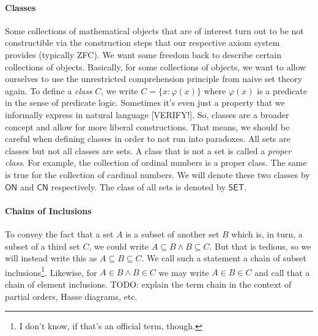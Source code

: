\paragraph{Classes}
Some collections of mathematical objects that are of interest turn out to be not constructible via the construction steps that our respective axiom system provides (typically ZFC). We want some freedom back to describe certain collections of objects. Basically, for some collections of objects, we want to allow ourselves to use the unrestricted comprehension principle from naive set theory again. To define a \emph{class} $C$, we write $C = \{x: \varphi(x)\}$ where $\varphi(x)$ is a predicate in the sense of predicate logic. Sometimes it's even just a property that we informally express in natural language [VERIFY!]. So, classes are a broader concept and allow for more liberal constructions. That means, we should be careful when defining classes in order to not run into paradoxes. All sets are classes but not all classes are sets. A class that is not a set is called a \emph{proper class}. For example, the collection of ordinal numbers is a proper class. The same is true for the collection of cardinal numbers. We will denote these two classes by $\mathsf{ON}$ and $\mathsf{CN}$ respectively. The class of all sets is denoted by $\mathsf{SET}$.






\paragraph{Chains of Inclusions}
To convey the fact that a set $A$ is a subset of another set $B$ which is, in turn, a subset of a third set $C$, we could write $A \subseteq B \wedge B \subseteq C$. But that is tedious, so we will instead write this as $A \subseteq B \subseteq C$. We call such a statement a chain of subset inclusions\footnote{I don't know, if that's an official term, though.}. Likewise, for $A \in B \wedge B \in C$ we may write $A \in B \in C$ and call that a chain of element inclusions. TODO: explain the term chain in the context of partial orders, Hasse diagrams, etc.

